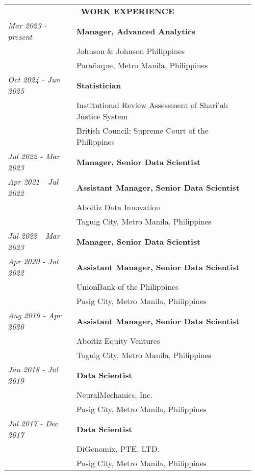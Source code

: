 \begin{tabular}{ll}
    \multicolumn{2}{c}{\bf WORK EXPERIENCE}\\[0.3cm]
    \textit{Mar 2023 - present}& \textbf{Manager, Advanced Analytics}\\
    & Johnson \& Johnson Philippines\\
    & Parañaque, Metro Manila, Philippines\\[0.5cm]
    
    \textit{Oct 2024 - Jun 2025}& \textbf{Statistician}\\
    &Institutional Review Assessment of Shari'ah Justice System\\
    &British Council; Supreme Court of the Philippines\\[0.5cm]

    \textit{Jul 2022 - Mar 2023}& \textbf{Manager, Senior Data Scientist}\\
    \textit{Apr 2021 - Jul 2022}& \textbf{Assistant Manager, Senior Data Scientist}\\
    & Aboitiz Data Innovation\\
    & Taguig City, Metro Manila, Philippines\\[0.5cm]
    
    \textit{Jul 2022 - Mar 2023}& \textbf{Manager, Senior Data Scientist}\\
    \textit{Apr 2020 - Jul 2022}& \textbf{Assistant Manager, Senior Data Scientist}\\
    & UnionBank of the Philippines\\
    & Pasig City, Metro Manila, Philippines\\[0.5cm]
    
    \textit{Aug 2019 - Apr 2020}& \textbf{Assistant Manager, Senior Data Scientist}\\
    & Aboitiz Equity Ventures\\
    & Taguig City, Metro Manila, Philippines\\[0.5cm]
    
    \textit{Jan 2018 - Jul 2019}& \textbf{Data Scientist}\\
    & NeuralMechanics, Inc.\\
    & Pasig City, Metro Manila, Philippines\\[0.5cm]
    
    \textit{Jul 2017 - Dec 2017}& \textbf{Data Scientist}\\
    & DiGenomix, PTE. LTD.\\
    & Pasig City, Metro Manila, Philippines\\[0.5cm]
\end{tabular}

